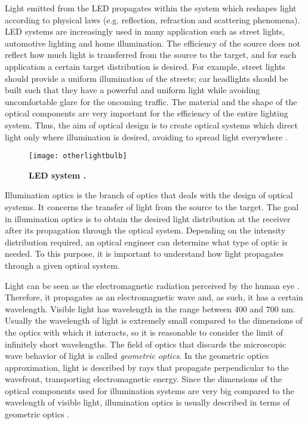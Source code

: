 Light emitted from the LED propagates within the system which reshapes light according to physical laws (e.g. reflection, refraction and scattering phenomena). LED systems are increasingly used in many application such as street lights, automotive lighting and home illumination. The efficiency of the source does not reflect how much light is transferred from the source to the target, and for each application a certain target distribution is desired. For example, street lights should provide a uniform illumination of the streets; car headlights should be built such that they have a powerful and uniform light while avoiding uncomfortable glare for the oncoming traffic. The material and the shape of the optical components are very important for the efficiency of the entire lighting system. Thus, the aim of optical design is to create optical systems which direct light only where illumination is desired, avoiding to spread light everywhere \cite{taguchi2008present, haitz2011solid}. 
\begin{figure}[h]
\centering
  \begin{minipage}[t]{0.5\textwidth}
    \texttt{[image: otherlightbulb]}
    \caption{\textbf{LED system \cite{Schweber}.}}
    \label{fig:led}
\end{minipage}
\end{figure}

Illumination optics is the branch of optics that deals with the design of optical systems. It concerns the transfer of light from the source to the target. The goal in illumination optics is to obtain the desired light distribution at the receiver after its propagation through the optical system. Depending on the intensity distribution required, an optical engineer can determine what type of optic is needed. To this purpose, it is important to understand how light propagates through a given optical system.

Light can be seen as the electromagnetic radiation perceived by the human eye \cite{schreuder2008outdoor}. Therefore, it propagates as an electromagnetic wave and, as such, it has a certain wavelength. Visible light has wavelength in the range between $400$ and $700$ nm. Usually the wavelength of light is extremely small compared to the dimensions of the optics with which it interacts, so it is reasonable to consider the limit of infinitely short wavelengths. The field of optics that discards the microscopic wave behavior of light is called \textit{geometric optics}. In the geometric optics approximation, light is described by rays that propagate perpendicular to the wavefront, transporting electromagnetic energy. Since the dimensions of the optical components used for illumination systems are very big compared to the wavelength of visible light, illumination optics is usually described in terms of geometric optics \cite{born2013principles}. 

